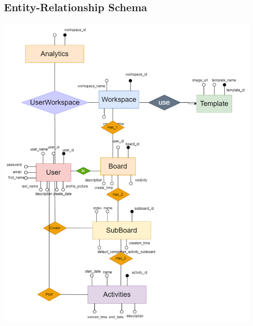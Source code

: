 \subsection{Entity-Relationship Schema}

\includegraphics[width=\columnwidth]{images/ER-schma.png}

